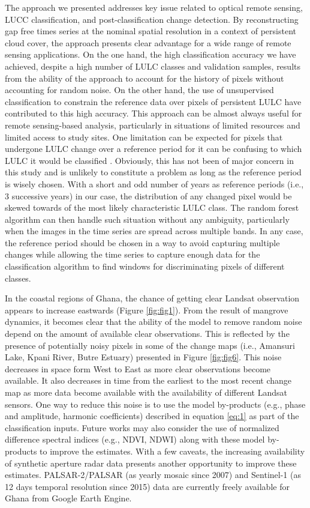 \documentclass[12pt,oneside,preprint,3p,authoryear,times]{elsarticle} %
\begin{document}
The approach we presented addresses key issue related to optical remote
sensing, LUCC classification, and post-classification change detection.
By reconstructing gap free times series at the nominal spatial
resolution in a context of persistent cloud cover, the approach presents
clear advantage for a wide range of remote sensing applications. On the
one hand, the high classification accuracy we have achieved, despite a
high number of LULC classes and validation samples, results from the
ability of the approach to account for the history of pixels without
accounting for random noise. On the other hand, the use of unsupervised
classification to constrain the reference data over pixels of persistent
LULC have contributed to this high accuracy. This approach can be almost
always useful for remote sensing-based analysis, particularly in
situations of limited resources and limited access to study sites. One
limitation can be expected for pixels that undergone LULC change over a
reference period for it can be confusing to which LULC it would be
classified \citep{Zhu-and-Woodcock-2014}. Obviously, this has not been
of major concern in this study and is unlikely to constitute a problem
as long as the reference period is wisely chosen. With a short and odd
number of years as reference periods (i.e., 3 successive years) in our
case, the distribution of any changed pixel would be skewed towards of
the most likely characteristic LULC class. The random forest algorithm
can then handle such situation without any ambiguity, particularly when
the images in the time series are spread across multiple bands. In any
case, the reference period should be chosen in a way to avoid capturing
multiple changes while allowing the time series to capture enough data
for the classification algorithm to find windows for discriminating
pixels of different classes.

In the coastal regions of Ghana, the chance of getting clear Landsat
observation appears to increase eastwards (Figure \ref{fig:fig1}). From
the result of mangrove dynamics, it becomes clear that the ability of
the model to remove random noise depend on the amount of available clear
observations. This is reflected by the presence of potentially noisy
pixels in some of the change maps (i.e., Amansuri Lake, Kpani River,
Butre Estuary) presented in Figure \ref{fig:fig6}. This noise decreases
in space form West to East as more clear observations become available.
It also decreases in time from the earliest to the most recent change
map as more data become available with the availability of different
Landsat sensors. One way to reduce this noise is to use the model
by-products (e.g., phase and amplitude, harmonic coefficients) described
in equation \eqref{eq:1} as part of the classification inputs. Future
works may also consider the use of normalized difference spectral
indices (e.g., NDVI, NDWI) along with these model by-products to improve
the estimates. With a few caveats, the increasing availability of
synthetic aperture radar data presents another opportunity to improve
these estimates. PALSAR-2/PALSAR (as yearly mosaic since 2007) and
Sentinel-1 (as 12 days temporal resolution since 2015) data are
currently freely available for Ghana from Google Earth Engine.
\end{document}
